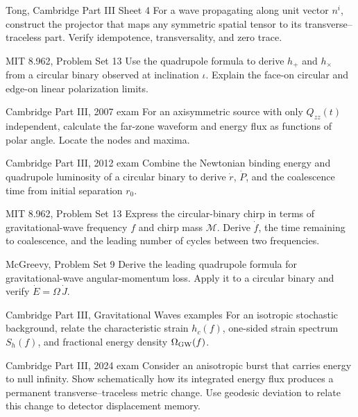\begin{exercise}{Tong, Cambridge Part III Sheet 4}
For a wave propagating along unit vector \(n^i\), construct the projector that
maps any symmetric spatial tensor to its transverse--traceless part.  Verify
idempotence, transversality, and zero trace.
\end{exercise}

\begin{exercise}{MIT 8.962, Problem Set 13}
Use the quadrupole formula to derive \(h_+\) and \(h_\times\) from a circular
binary observed at inclination \(\iota\).  Explain the face-on circular and
edge-on linear polarization limits.
\end{exercise}

\begin{exercise}{Cambridge Part III, 2007 exam}
For an axisymmetric source with only \(Q_{zz}(t)\) independent, calculate the
far-zone waveform and energy flux as functions of polar angle.  Locate the
nodes and maxima.
\end{exercise}

\begin{exercise}{Cambridge Part III, 2012 exam}
Combine the Newtonian binding energy and quadrupole luminosity of a circular
binary to derive \(\dot r\), \(\dot P\), and the coalescence time from initial
separation \(r_0\).
\end{exercise}

\begin{exercise}{MIT 8.962, Problem Set 13}
Express the circular-binary chirp in terms of gravitational-wave frequency
\(f\) and chirp mass \(\mathcal M\).  Derive \(\dot f\), the time remaining to
coalescence, and the leading number of cycles between two frequencies.
\end{exercise}

\begin{exercise}{McGreevy, Problem Set 9}
Derive the leading quadrupole formula for gravitational-wave angular-momentum
loss.  Apply it to a circular binary and verify
\(\dot E=\Omega\,\dot J\).
\end{exercise}

\begin{exercise}{Cambridge Part III, Gravitational Waves examples}
For an isotropic stochastic background, relate the characteristic strain
\(h_c(f)\), one-sided strain spectrum \(S_h(f)\), and fractional energy
density \(\Omega_{\rm GW}(f)\).
\end{exercise}

\begin{exercise}{Cambridge Part III, 2024 exam}
Consider an anisotropic burst that carries energy to null infinity.  Show
schematically how its integrated energy flux produces a permanent
transverse--traceless metric change.  Use geodesic deviation to relate this
change to detector displacement memory.
\end{exercise}
